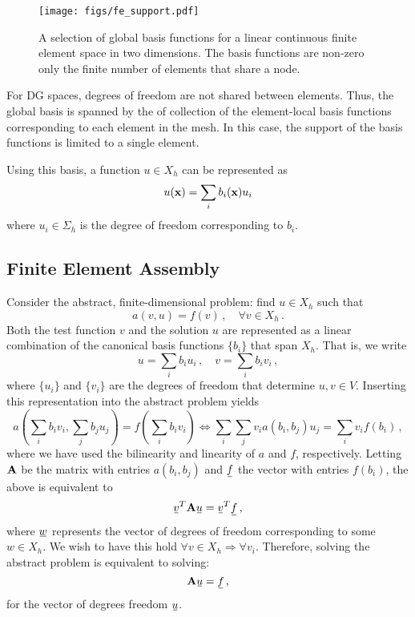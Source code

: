 \documentclass[../doc.tex]{subfiles}
\begin{document}
\begin{figure}
\centering
\texttt{[image: figs/fe\_support.pdf]}
\caption{A selection of global basis functions for a linear continuous finite element space in two dimensions. The basis functions are non-zero only the finite number of elements that share a node. }
\label{fem:fe_support}
\end{figure}

For DG spaces, degrees of freedom are not shared between elements. Thus, the global basis is spanned by the of collection of the element-local basis functions corresponding to each element in the mesh. In this case, the support of the basis functions is limited to a single element. 

Using this basis, a function $u \in X_h$ can be represented as 
	\begin{equation}
		u(\boldsymbol{\mathrm{x}}) = \sum_i b_i(\boldsymbol{\mathrm{x}}) u_i 
	\end{equation}
where $u_i \in \Sigma_h$ is the degree of freedom corresponding to $b_i$. 

\subsection{Finite Element Assembly}
Consider the abstract, finite-dimensional problem: find $u \in X_h$ such that 
	\begin{equation}
		a(v,u) = f(v) \,, \quad \forall v \in X_h \,. 
	\end{equation}
Both the test function $v$ and the solution $u$ are represented as a linear combination of the canonical basis functions $\{b_i\}$ that span $X_h$. That is, we write 
	\begin{equation}
		u = \sum_i b_i u_i \,, \quad v = \sum_i b_i v_i \,,
	\end{equation}
where $\{u_i\}$ and $\{v_i\}$ are the degrees of freedom that determine $u,v \in V$. Inserting this representation into the abstract problem yields 
	\begin{equation}
		a(\sum_i b_i v_i, \sum_j b_j u_j) = f(\sum_i b_i v_i) \iff \sum_i \sum_j v_i a(b_i,b_j) u_j = \sum_i v_i f(b_i) \,, 
	\end{equation} 
where we have used the bilinearity and linearity of $a$ and $f$, respectively. 
Letting $\boldsymbol{\mathrm{A}}$ be the matrix with entries $a(b_i, b_j)$ and $\ubar{f}$ the vector with entries $f(b_i)$, the above is equivalent to 
	\begin{equation}
		\ubar{v}^T \mat{A} \ubar{u} = \ubar{v}^T \ubar{f} \,, 
	\end{equation}
where $\ubar{w}$ represents the vector of degrees of freedom corresponding to some $w \in X_h$. 
We wish to have this hold $\forall v \in X_h \Rightarrow \forall v_i$. Therefore, solving the abstract problem is equivalent to solving: 
	\begin{equation}
		\mat{A} \ubar{u} = \ubar{f} \,, 
	\end{equation}
for the vector of degrees freedom $\ubar{u}$. 
\end{document}

